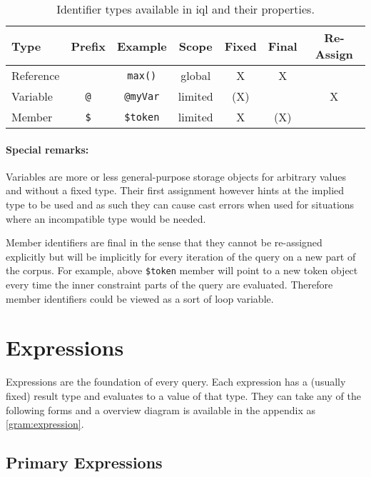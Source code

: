 \documentclass[11pt,a4paper]{report}
\begin{document}
\begin{table}[ht]
	\centering\begin{tabular}{|l|c|c|c|c|c|c|}
		\hline 
		Type	& Prefix & Example & Scope & Fixed\footnotemark & Final & Re-Assign \\ 
		\hline 
		Reference	&  & \texttt{max()} & global & X & X &  \\ 
		\hline 
		Variable	& \texttt{@} & \texttt{@myVar} & limited & (X) &  & X \\ 
		\hline 
		Member	& \texttt{\$} & \texttt{\$token} & limited & X & (X) &  \\ 
		\hline 
	\end{tabular}
	\caption[Identifier types]{Identifier types available in \ac{iql} and their properties.}
	\label{tab:identifiers}
\end{table}

\paragraph{Special remarks:}
\noindent Variables are more or less general-purpose storage objects for arbitrary values and without a fixed type. Their first assignment however hints at the implied type to be used and as such they can cause cast errors when used for situations where an incompatible type would be needed.

Member identifiers are final in the sense that they cannot be re-assigned explicitly but will be implicitly for every iteration of the query on a new part of the corpus. For example, above \texttt{\$token} member will point to a new token object every time the inner constraint parts of the query are evaluated. Therefore member identifiers could be viewed as a sort of loop variable. 

\section{Expressions}
\label{sec:expressions}

Expressions are the foundation of every query.
Each expression has a (usually fixed) result type and evaluates to a value of that type.
They can take any of the following forms and a overview diagram is available in the appendix as \cref{gram:expression}.

\subsection{Primary Expressions}
\label{sec:primary-expressions}
\end{document}

